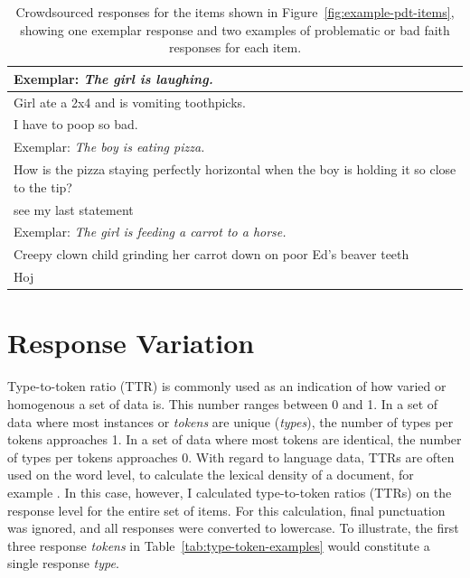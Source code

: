 \begin{table}[htb!]
\begin{center}
\begin{tabular}{|l|}
\hline
Exemplar: \textit{The girl is laughing.} \\
\hline
Girl ate a 2x4 and is vomiting toothpicks. \\
\hline
I have to poop so bad. \\
\hline
\hline
Exemplar: \textit{The boy is eating pizza.} \\
\hline
How is the pizza staying perfectly horizontal when the boy is holding it so close to the tip? \\
\hline
see my last statement \\
\hline
\hline
Exemplar: \textit{The girl is feeding a carrot to a horse.} \\
\hline
Creepy clown child grinding her carrot down on poor Ed's beaver teeth \\
\hline
Hoj \\
\hline
\end{tabular}
\caption{\label{tab:bad-faith} Crowdsourced responses for the items shown in Figure~\ref{fig:example-pdt-items}, showing one exemplar response and two examples of problematic or bad faith responses for each item.}
\end{center}
\end{table}


\section{Response Variation}
\label{sec:response-variation}
Type-to-token ratio (TTR) is commonly used as an indication of how varied or homogenous a set of data is. This number ranges between 0 and 1. In a set of data where most instances or \textit{tokens} are unique (\textit{types}), the number of types per tokens approaches 1. In a set of data where most tokens are identical, the number of types per tokens approaches 0. With regard to language data, TTRs are often used on the word level, to calculate the lexical density of a document, for example \citep{granger2002computer}. In this case, however, I calculated type-to-token ratios (TTRs) on the response level for the entire set of items. For this calculation, final punctuation was ignored, and all responses were converted to lowercase. To illustrate, the first three response \textit{tokens} in Table~\ref{tab:type-token-examples} would constitute a single response \textit{type}.

